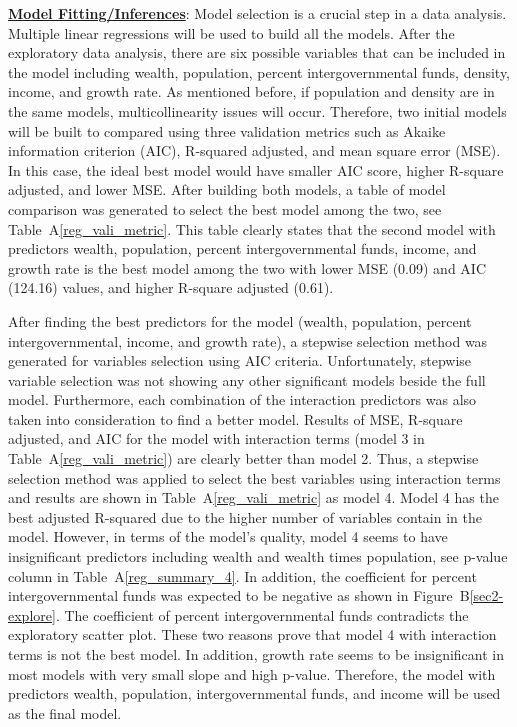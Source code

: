 \documentclass[11pt]{article}\usepackage[]{graphicx}\usepackage[]{color}
\begin{document}
\noindent\textbf{\underline{Model Fitting/Inferences}}: Model selection is a crucial step in a data analysis. Multiple linear regressions will be used to build all the models. After the exploratory data analysis, there are six possible variables that can be included in the model including wealth, population, percent intergovernmental funds, density, income, and growth rate. As mentioned before, if population and density are in the same models, multicollinearity issues will occur. Therefore, two initial models will be built to compared using three validation metrics such as Akaike information criterion (AIC), R-squared adjusted, and mean square error (MSE). In this case, the ideal best model would have smaller AIC score, higher R-square adjusted, and lower MSE. After building both models, a table of model comparison was generated to select the best model among the two, see Table~A\ref{reg_vali_metric}. This table clearly states that the second model with predictors wealth, population, percent intergovernmental funds, income, and growth rate is the best model among the two with lower MSE (0.09) and AIC (124.16) values, and higher R-square adjusted (0.61).
\hfill \break

\noindent After finding the best predictors for the model (wealth, population, percent intergovernmental, income, and growth rate), a stepwise selection method was generated for variables selection using AIC criteria. Unfortunately, stepwise variable selection was not showing any other significant models beside the full model. Furthermore, each combination of the interaction predictors was also taken into consideration to find a better model. Results of MSE, R-square adjusted, and AIC for the model with interaction terms (model 3 in Table~A\ref{reg_vali_metric}) are clearly better than model 2. Thus, a stepwise selection method was applied to select the best variables using interaction terms and results are shown in Table~A\ref{reg_vali_metric} as model 4. Model 4 has the best adjusted R-squared due to the higher number of variables contain in the model. However, in terms of the model's quality, model 4 seems to have insignificant predictors including wealth and wealth times population, see p-value column in Table~A\ref{reg_summary_4}. In addition, the coefficient for percent intergovernmental funds was expected to be negative as shown in Figure~B\ref{sec2-explore}. The coefficient of percent intergovernmental funds contradicts the exploratory scatter plot. These two reasons prove that model 4 with interaction terms is not the best model. In addition, growth rate seems to be insignificant in most models with very small slope and high p-value. Therefore, the model with predictors wealth, population, intergovernmental funds, and income will be used as the final model.
\hfill \break
\end{document}

